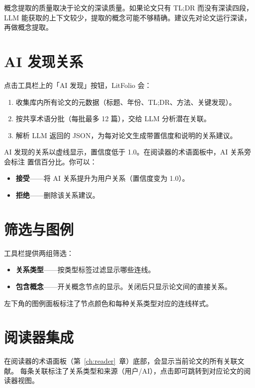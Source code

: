 \begin{tipbox}
概念提取的质量取决于论文的深读质量。如果论文只有 TL;DR 而没有深读四段，
LLM 能获取的上下文较少，提取的概念可能不够精确。建议先对论文运行深读，
再做概念提取。
\end{tipbox}

\section{AI 发现关系}

点击工具栏上的「AI 发现」按钮，LitFolio 会：

\begin{enumerate}
  \item 收集库内所有论文的元数据（标题、年份、TL;DR、方法、关键发现）。
  \item 按共享术语分批（每批最多 12 篇），交给 LLM 分析潜在关联。
  \item 解析 LLM 返回的 JSON，为每对论文生成带置信度和说明的关系建议。
\end{enumerate}

AI 发现的关系以虚线显示，置信度低于 1.0。在阅读器的术语面板中，AI 关系旁会标注
置信百分比。你可以：

\begin{itemize}
  \item \textbf{接受}——将 AI 关系提升为用户关系（置信度变为 1.0）。
  \item \textbf{拒绝}——删除该关系建议。
\end{itemize}

\section{筛选与图例}

工具栏提供两组筛选：

\begin{itemize}
  \item \textbf{关系类型}——按类型标签过滤显示哪些连线。
  \item \textbf{包含概念}——开关概念节点的显示。关闭后只显示论文间的直接关系。
\end{itemize}

左下角的图例面板标注了节点颜色和每种关系类型对应的连线样式。

\section{阅读器集成}

在阅读器的术语面板（第~\ref{ch:reader}~章）底部，会显示当前论文的所有关联文献。
每条关联标注了关系类型和来源（用户/AI），点击即可跳转到对应论文的阅读器视图。

